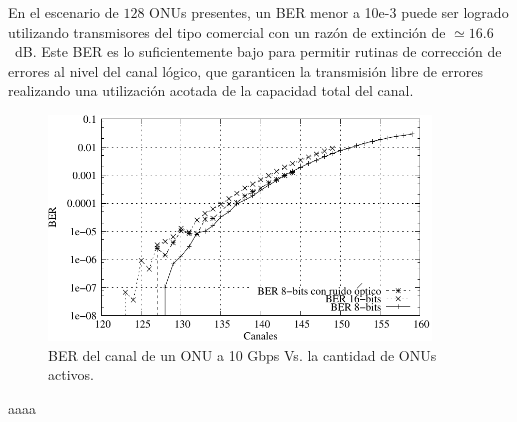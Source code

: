 En el escenario de $128$ ONUs presentes, un BER menor a 10e-3 puede ser logrado utilizando transmisores del tipo comercial con un razón de extinción de $\simeq16.6$~dB.
Este BER es lo suficientemente bajo para permitir rutinas de corrección de errores al nivel del canal lógico, que garanticen la transmisión libre de errores realizando una utilización acotada de la capacidad total del canal.

\begin{figure}[t]
  \centering
  \includegraphics[width=4in]{graphs/BER-tesis.pdf} 
  \caption{BER del canal de un ONU a 10 Gbps Vs. la cantidad de ONUs activos.}
  \label{sim:access}
\end{figure}
aaaa

